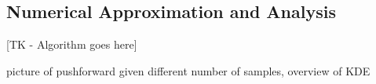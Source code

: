 \subsection{Numerical Approximation and Analysis}\label{sec:sample-algorithm}

[TK - Algorithm goes here]

picture of pushforward given different number of samples, overview of KDE
